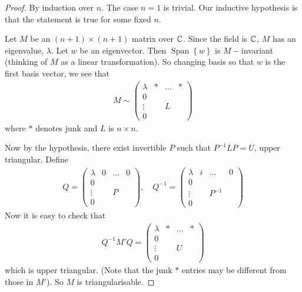 \documentclass{article}
\theoremstyle{definition} \newtheorem*{definition}{Definition}
\DeclareMathOperator{\Span}{Span}
\begin{document}
\begin{proof}
  By induction over $n$. The case $n=1$ is trivial. Our inductive
  hypothesis is that the statement is true for some fixed $n$.

  Let $M$ be an $(n+1)\times (n+1)$ matrix over $\mathbb{C}$. Since
  the field is $\mathbb{C}$, $M$ has an eigenvalue, $\lambda$. Let
  $w$ be an eigenvector. Then $\Span\left\{ w \right\}$ is $M-$invariant
  (thinking of $M$ as a linear transformation). So changing basis so that
  $w$ is the first basis vector, we see that 
  \begin{align*}
    M \sim 
    \left( 
    \begin{matrix}
      \lambda & * & \dots & *\\
      0 & &&\\
      \vdots&&L&\\
      0&&&
    \end{matrix}
    \right)
  \end{align*}
  where $*$ denotes junk and $L$ is $n\times n$.

  Now by the hypothesis, there exist invertible $P$ such that 
  $P^{-1}LP=U$, upper triangular. Define
  \begin{align*}
    Q = 
    \left( 
    \begin{matrix}
      \lambda & 0 & \dots & 0\\
      0 & &&\\
      \vdots&&P&\\
      0&&&
    \end{matrix}
    \right)
    ,\quad Q^{-1}=
    \left( 
    \begin{matrix}
      \lambda & i & \dots & 0\\
      0 & &&\\
      \vdots&&P^{-1}&\\
      0&&&
    \end{matrix}
    \right)
  \end{align*}
  Now it is easy to check that
  \begin{align*}
    Q^{-1}M'Q = 
    \left( 
    \begin{matrix}
      \lambda & * & \dots & *\\
      0 & &&\\
      \vdots&&U&\\
      0&&&
    \end{matrix}
    \right)
  \end{align*}
  which is upper triangular. (Note that the junk $*$ entries may be
  different from those in $M'$). So $M$ is triangularisable.
\end{proof}
\end{document}
